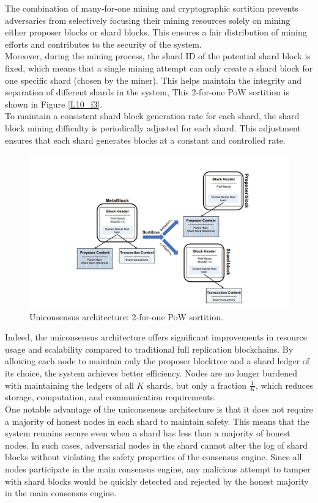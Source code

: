 The combination of many-for-one mining and cryptographic sortition prevents adversaries from selectively focusing their mining resources solely on mining either proposer blocks or shard blocks. This ensures a fair distribution of mining efforts and contributes to the security of the system.\\
Moreover, during the mining process, the shard ID of the potential shard block is fixed, which means that a single mining attempt can only create a shard block for one specific shard (chosen by the miner). This helps maintain the integrity and separation of different shards in the system, This 2-for-one PoW sortition
is shown in Figure \ref{L10_f3}.\\
To maintain a consistent shard block generation rate for each shard, the shard block mining difficulty is periodically adjusted for each shard. This adjustment ensures that each shard generates blocks at a constant and controlled rate.
\begin{center}
	\begin{figure}
		\centering
		\includegraphics[width=0.8\linewidth]{Fig/10/F3}
		\caption{Uniconsensus architecture: 2-for-one PoW sortition.}
		\label{fig:L10_f3}
	\end{figure}
\end{center}
Indeed, the uniconsensus architecture offers significant improvements in resource usage and scalability compared to traditional full replication blockchains. By allowing each node to maintain only the proposer blocktree and a shard ledger of its choice, the system achieves better efficiency. Nodes are no longer burdened with maintaining the ledgers of all $K$ shards, but only a fraction $\frac{1}{K}$, which reduces storage, computation, and communication requirements.\\
One notable advantage of the uniconsensus architecture is that it does not require a majority of honest nodes in each shard to maintain safety. This means that the system remains secure even when a shard has less than a majority of honest nodes. In such cases, adversarial nodes in the shard cannot alter the log of shard blocks without violating the safety properties of the consensus engine. Since all nodes participate in the main consensus engine, any malicious attempt to tamper with shard blocks would be quickly detected and rejected by the honest majority in the main consensus engine.\\
